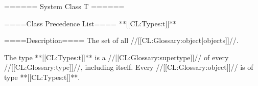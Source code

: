 ====== System Class T ======

====Class Precedence List==== **[[CL:Types:t]]**

====Description==== The set of all //[[CL:Glossary:object|objects]]//.

The type **[[CL:Types:t]]** is a //[[CL:Glossary:supertype]]// of every //[[CL:Glossary:type]]//, including itself. Every //[[CL:Glossary:object]]// is of type **[[CL:Types:t]]**.

